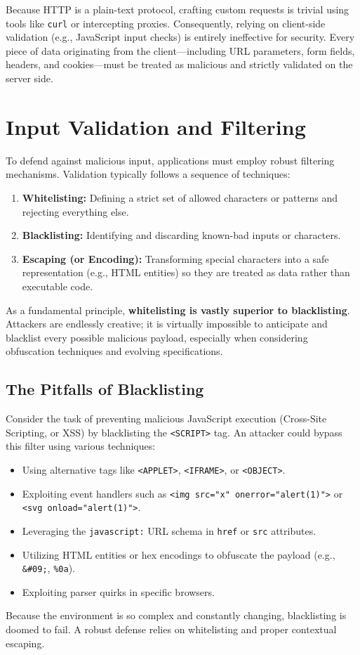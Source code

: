 Because HTTP is a plain-text protocol, crafting custom requests is trivial using tools like \texttt{curl} or intercepting proxies. Consequently, relying on client-side validation (e.g., JavaScript input checks) is entirely ineffective for security. Every piece of data originating from the client---including URL parameters, form fields, headers, and cookies---must be treated as malicious and strictly validated on the server side.

\section{Input Validation and Filtering}
To defend against malicious input, applications must employ robust filtering mechanisms. Validation typically follows a sequence of techniques:
\begin{enumerate}
    \item \textbf{Whitelisting:} Defining a strict set of allowed characters or patterns and rejecting everything else.
    \item \textbf{Blacklisting:} Identifying and discarding known-bad inputs or characters.
    \item \textbf{Escaping (or Encoding):} Transforming special characters into a safe representation (e.g., HTML entities) so they are treated as data rather than executable code.
\end{enumerate}

As a fundamental principle, \textbf{whitelisting is vastly superior to blacklisting}. Attackers are endlessly creative; it is virtually impossible to anticipate and blacklist every possible malicious payload, especially when considering obfuscation techniques and evolving specifications.

\subsection{The Pitfalls of Blacklisting}
Consider the task of preventing malicious JavaScript execution (Cross-Site Scripting, or XSS) by blacklisting the \texttt{<SCRIPT>} tag. An attacker could bypass this filter using various techniques:
\begin{itemize}
    \item Using alternative tags like \texttt{<APPLET>}, \texttt{<IFRAME>}, or \texttt{<OBJECT>}.
    \item Exploiting event handlers such as \texttt{<img src="x" onerror="alert(1)">} or \texttt{<svg onload="alert(1)">}.
    \item Leveraging the \texttt{javascript:} URL schema in \texttt{href} or \texttt{src} attributes.
    \item Utilizing HTML entities or hex encodings to obfuscate the payload (e.g., \texttt{\&\#09;}, \texttt{\%0a}).
    \item Exploiting parser quirks in specific browsers.
\end{itemize}
Because the environment is so complex and constantly changing, blacklisting is doomed to fail. A robust defense relies on whitelisting and proper contextual escaping.


